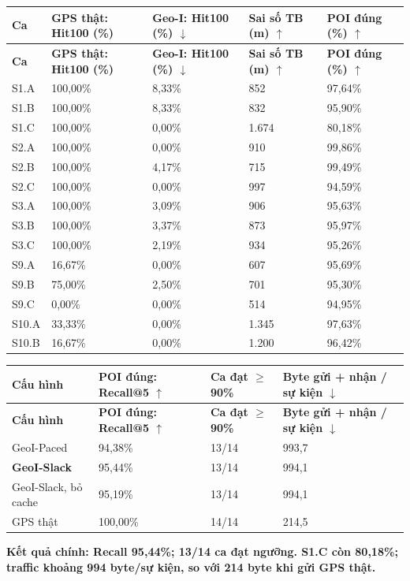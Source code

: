 \documentclass[10pt,a4paper]{article}
\newcommand{\key}[1]{\par\smallskip\noindent\colorbox{pale}{\parbox{\dimexpr\linewidth-2\fboxsep}{\textbf{#1}}}\par\smallskip}
\begin{document}
\begingroup\small
\begin{longtable}{@{}P{1.618cm}P{3.741cm}P{3.741cm}P{3.640cm}P{3.336cm}@{}}
\toprule
\textbf{Ca} & \textbf{GPS thật: Hit100 (\%)} & \textbf{Geo-I: Hit100 (\%) $\downarrow$} & \textbf{Sai số TB (m) $\uparrow$} & \textbf{POI đúng (\%) $\uparrow$}\\\midrule
\endfirsthead
\toprule
\textbf{Ca} & \textbf{GPS thật: Hit100 (\%)} & \textbf{Geo-I: Hit100 (\%) $\downarrow$} & \textbf{Sai số TB (m) $\uparrow$} & \textbf{POI đúng (\%) $\uparrow$}\\\midrule
\endhead
\bottomrule\endfoot
S1.A & 100,00\% & 8,33\% & 852 & 97,64\%\\
\addlinespace[3pt]
S1.B & 100,00\% & 8,33\% & 832 & 95,90\%\\
\addlinespace[3pt]
S1.C & 100,00\% & 0,00\% & 1.674 & 80,18\%\\
\addlinespace[3pt]
S2.A & 100,00\% & 0,00\% & 910 & 99,86\%\\
\addlinespace[3pt]
S2.B & 100,00\% & 4,17\% & 715 & 99,49\%\\
\addlinespace[3pt]
S2.C & 100,00\% & 0,00\% & 997 & 94,59\%\\
\addlinespace[3pt]
S3.A & 100,00\% & 3,09\% & 906 & 95,63\%\\
\addlinespace[3pt]
S3.B & 100,00\% & 3,37\% & 873 & 95,97\%\\
\addlinespace[3pt]
S3.C & 100,00\% & 2,19\% & 934 & 95,26\%\\
\addlinespace[3pt]
S9.A & 16,67\% & 0,00\% & 607 & 95,69\%\\
\addlinespace[3pt]
S9.B & 75,00\% & 2,50\% & 701 & 95,30\%\\
\addlinespace[3pt]
S9.C & 0,00\% & 0,00\% & 514 & 94,95\%\\
\addlinespace[3pt]
S10.A & 33,33\% & 0,00\% & 1.345 & 97,63\%\\
\addlinespace[3pt]
S10.B & 16,67\% & 0,00\% & 1.200 & 96,42\%\\
\end{longtable}
\endgroup
\begingroup\small
\begin{longtable}{@{}P{4.839cm}P{3.581cm}P{3.194cm}P{4.742cm}@{}}
\toprule
\textbf{Cấu hình} & \textbf{POI đúng: Recall@5 $\uparrow$} & \textbf{Ca đạt $\ge$90\%} & \textbf{Byte gửi + nhận / sự kiện $\downarrow$}\\\midrule
\endfirsthead
\toprule
\textbf{Cấu hình} & \textbf{POI đúng: Recall@5 $\uparrow$} & \textbf{Ca đạt $\ge$90\%} & \textbf{Byte gửi + nhận / sự kiện $\downarrow$}\\\midrule
\endhead
\bottomrule\endfoot
GeoI-Paced & 94,38\% & 13/14 & 993,7\\
\addlinespace[3pt]
\textbf{GeoI-Slack} & 95,44\% & 13/14 & 994,1\\
\addlinespace[3pt]
GeoI-Slack, bỏ cache & 95,19\% & 13/14 & 994,1\\
\addlinespace[3pt]
GPS thật & 100,00\% & 14/14 & 214,5\\
\end{longtable}
\endgroup
\key{Kết quả chính: Recall 95,44\%; 13/14 ca đạt ngưỡng. S1.C còn 80,18\%; traffic khoảng 994 byte/sự kiện, so với 214 byte khi gửi GPS thật.}
\end{document}

